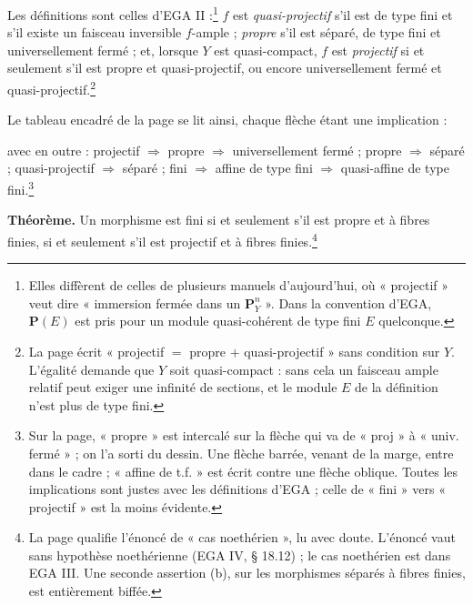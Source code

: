 \documentclass[11pt,a4paper]{article}
\begin{document}
Les définitions sont celles d'EGA II :\footnote{Elles diffèrent de celles de
plusieurs manuels d'aujourd'hui, où « projectif » veut dire « immersion fermée
dans un $\mathbf{P}^n_Y$ ». Dans la convention d'EGA, $\mathbf{P}(E)$ est pris
pour un module quasi-cohérent de type fini $E$ quelconque.} $f$ est
\emph{quasi-projectif} s'il est de type fini et s'il existe un faisceau
inversible $f$-ample ; \emph{propre} s'il est séparé, de type fini et
universellement fermé ; et, lorsque $Y$ est quasi-compact, $f$ est
\emph{projectif} si et seulement s'il est propre et quasi-projectif, ou encore
universellement fermé et quasi-projectif.\footnote{La page écrit
« projectif $=$ propre $+$ quasi-projectif » sans condition sur $Y$. L'égalité
demande que $Y$ soit quasi-compact : sans cela un faisceau ample relatif peut
exiger une infinité de sections, et le module $E$ de la définition n'est plus
de type fini.}

Le tableau encadré de la page se lit ainsi, chaque flèche étant une
implication :


avec en outre : projectif $\Rightarrow$ propre $\Rightarrow$ universellement
fermé ; propre $\Rightarrow$ séparé ; quasi-projectif $\Rightarrow$ séparé ;
fini $\Rightarrow$ affine de type fini $\Rightarrow$ quasi-affine de type
fini.\footnote{Sur la page, « propre » est intercalé sur la flèche qui va de
« proj » à « univ. fermé » ; on l'a sorti du dessin. Une flèche barrée, venant
de la marge, entre dans le cadre ; « affine de t.f. » est écrit contre une
flèche oblique. Toutes les implications sont justes avec les définitions
d'EGA ; celle de « fini » vers « projectif » est la moins évidente.}

\textbf{Théorème.} Un morphisme est fini si et seulement s'il est propre et à
fibres finies, si et seulement s'il est projectif et à fibres
finies.\footnote{La page qualifie l'énoncé de « cas noethérien », lu avec
doute. L'énoncé vaut sans hypothèse noethérienne (EGA IV, § 18.12) ; le cas
noethérien est dans EGA III. Une seconde assertion (b), sur les morphismes
séparés à fibres finies, est entièrement biffée.}
\end{document}
